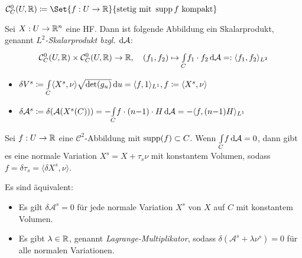 \documentclass{cheat-sheet}
\newcommand{\A}{\mathcal{A}} %
\newcommand{\Cont}{\mathcal{C}} %
\begin{document}
\begin{nota}
  $\Cont^0_C(U, \R) \coloneqq \Set{ f : U \to \R }{ \text{stetig mit } \supp f \text{ kompakt} }$
\end{nota}

\iffalse
  $V = \Cont^0(C, \R) = \Set{ f : C \to \R }{ \text{stetig} }$

  Skalarprodukt:
  \begin{align*}
    \Cont^0(C, \R) \times \Cont^0(C, \R) &\to \R
    (f_1, f_2) &\mapsto \Int{C}{}{f_1 \cdot f_2}{\A} =: \langle f_1 , f_2 \rangle_{L^2}
  \end{align*}
\fi

\begin{defn}
  Sei $X : U \to \mathbb{R}^n$ eine HF. Dann ist folgende Abbildung ein Skalarprodukt, genannt \emph{$L^2$-Skalarprodukt bzgl. $\d \A$}:
  \[
    \Cont^0_C(U, \R) \times \Cont^0_C(U, \R) \to \R, \quad
    (f_1, f_2) \mapsto \Int{C}{}{f_1 \cdot f_2}{\A} =: \langle f_1 , f_2 \rangle_{L^2}
  \]
\end{defn}

\begin{nota}
  \begin{itemize}
    \item $\delta V^s \coloneqq {\textstyle \int\limits_{C}^{}} \langle X^s , \nu \rangle \sqrt{\det(g_u)} \,\mathrm{d} u = \langle f , 1 \rangle_{L^1}, f \coloneqq \langle X^s , \nu \rangle$
    \item $\delta \A^s \coloneqq \delta(\A(X^s(C))) = - \Int{C}{}{f \cdot (n{-}1) \cdot H}{\A} = - \langle f, (n{-}1) H \rangle_{L^1}$
  \end{itemize}
\end{nota}




\begin{lem}
  Sei $f : U \to \mathbb{R}$ eine $\Cont^2$-Abbildung mit $\operatorname{supp}(f) \subset C$. Wenn $\Int{C}{}{f}{\A} = 0$, dann gibt es eine normale Variation $X^s = X + \tau_s \nu$ mit konstantem Volumen, sodass $f = \delta \tau_s = \langle \delta X^s , \nu \rangle$.
\end{lem}

\begin{prop}
  Es sind äquivalent:
  \begin{itemize}
    \item Es gilt $\delta \A^s = 0$ für jede normale Variation $X^s$ von $X$ auf $C$ mit konstantem Volumen.
    \item Es gibt $\lambda \in \mathbb{R}$, genannt \emph{Lagrange-Multiplikator}, sodass $\delta(\A^s + \lambda \nu^s) = 0$ für alle normalen Variationen.
  \end{itemize}
\end{prop}
\end{document}
